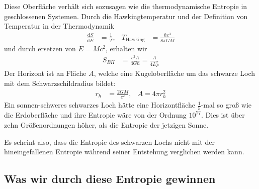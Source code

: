 \documentclass[ngerman]{scrartcl}
\newcommand{\diff}{\mathrm{d}}
\begin{document}
	Diese Oberfläche verhält sich sozusagen wie die thermodynamische Entropie in geschlossenen Systemen. 
	Durch die Hawkingtemperatur \cite{ParticleCreation} und der Definition von Temperatur in der Thermodynamik
		\begin{align}
			\frac{\diff S}{\diff E} &= \frac{1}{T},&
			T_{\text{Hawking}} &= \frac{\hbar c^3}{8 \pi G M}
		\end{align}
	und durch ersetzen von $E = Mc^2$, erhalten wir
		\begin{align}
			S_{BH} &= \frac{c^3 A}{4 G \hbar} = \frac{A}{4 L_P^2} 
		\end{align}
	Der Horizont ist an Fläche $A$, welche eine Kugeloberfläche um das schwarze Loch mit dem Schwarzschildradius bildet:
		\begin{align}
			r_h &= \frac{2 GM}{c^2} ,& A = 4 \pi r_h^2 
		\end{align}
	Ein sonnen-schweres schwarzes Loch hätte eine Horizontfläche $\frac{1}{5}$-mal so groß wie die Erdoberfläche und ihre Entropie wäre von der Ordnung $10^{77}$. Dies ist über zehn Größenordnungen höher, als die Entropie der jetzigen Sonne.  
	
	Es scheint also, dass die Entropie des schwarzen Lochs nicht mit der hineingefallenen Entropie während seiner Entstehung verglichen werden kann.
	
	\subsection*{Was wir durch diese Entropie gewinnen}
	
\end{document}
